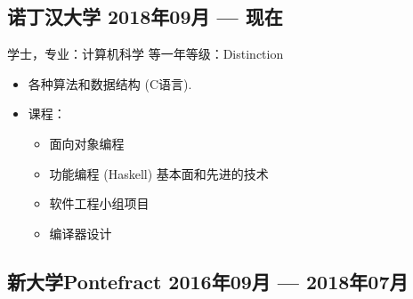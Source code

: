\documentclass[10pt]{extarticle}
\begin{document}
        \subsection{诺丁汉大学 %
        \hfill 2018年09月 --- 现在}
        学士，专业：计算机科学
        \hfill
        等一年等级：Distinction\\
        {}
        \begin{itemize}
            \item 各种算法和数据结构 (C语言).
            \item 课程：
                \begin{itemize}
                    \item 面向对象编程
                    \item 功能编程 (Haskell) \textendash{} 基本面和先进的技术
                    \item 软件工程小组项目
                    \item 编译器设计
                \end{itemize}
        \end{itemize}
        \subsection{新大学Pontefract %
            \hfill 2016年09月 --- 2018年07月}
\end{document}
